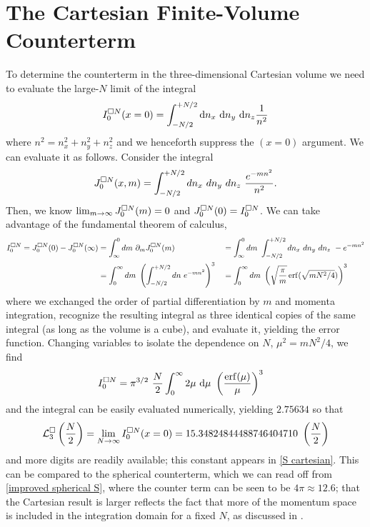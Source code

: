 \section{The Cartesian \Luscher Finite-Volume Counterterm}\label{sec:counterterm/cartesian}

To determine the counterterm in the three-dimensional Cartesian volume we need to evaluate the large-$N$ limit of the integral
\begin{equation}
	I^{\square N}_0(x=0) = \int_{-N/2}^{+N/2} \mathrm{d}n_x\ \mathrm{d}n_y\ \mathrm{d}n_z \frac{1}{n^2}
\end{equation}
where $n^2 = n_x^2+n_y^2+n_z^2$ and we henceforth suppress the $(x=0)$ argument.
We can evaluate it as follows.  Consider the integral
\begin{equation}
	J^{\square N}_0(x, m) = \int_{-N/2}^{+N/2} dn_x\ dn_y\ dn_z\ \frac{e^{-m n^2}}{n^2}.
\end{equation}
Then, we know $\lim_{m\rightarrow\infty} J^{\square N}_0(m) = 0$ and $J^{\square N}_0(0) = I^{\square N}_0$.
We can take advantage of the fundamental theorem of calculus,
\begin{align}
	I^{\square N}_0 = J^{\square N}_0(0) - J^{\square N}_0(\infty)
		&= 	\int_{\infty}^{0} dm\ \partial_m J^{\square N}_0(m)
		&&=	\int_{\infty}^{0} dm\ \int_{-N/2}^{+N/2} dn_x\ dn_y\ dn_z\ -e^{-m n^2}
		\nonumber\\
		&=	\int_0^\infty dm\ \left(\int_{-N/2}^{+N/2} dn\ e^{-m n^2}\right)^3
		&&=	\int_0^\infty dm\ \left(\sqrt{\frac{\pi}{m}} \operatorname{erf}(\sqrt{m N^2/4})\right)^3
\end{align}
where we exchanged the order of partial differentiation by $m$ and momenta integration, recognize the resulting integral as three identical copies of the same integral (as long as the volume is a cube), and evaluate it, yielding the error function.
Changing variables to isolate the dependence on $N$, $\mu^2 = m N^2/4$, we find
\begin{align}
    I^{\square N}_0
    &=
    \pi^{3/2}\ \frac{N}{2} \int_{0}^\infty 2\mu\ \mathrm{d}\mu\ \left(\frac{\operatorname{erf}(\mu)}{\mu}\right)^3
\end{align}
and the integral can be easily evaluated numerically, yielding $2.75634$ so that
\begin{equation}
    \mathcal{L}^\square_3 \left(\frac{N}{2}\right) = \lim_{N\rightarrow\infty}I^{\square N}_0(x=0) = 15.34824844488746404710\ \left(\frac{N}{2}\right)
\end{equation}
and more digits are readily available; this constant appears in \eqref{S cartesian}.
This can be compared to the spherical counterterm, which we can read off from \eqref{improved spherical S}, where the counter term can be seen to be $4\pi \approx 12.6 $; that the Cartesian result is larger reflects the fact that more of the momentum space is included in the integration domain for a fixed $N$, as discussed in .

